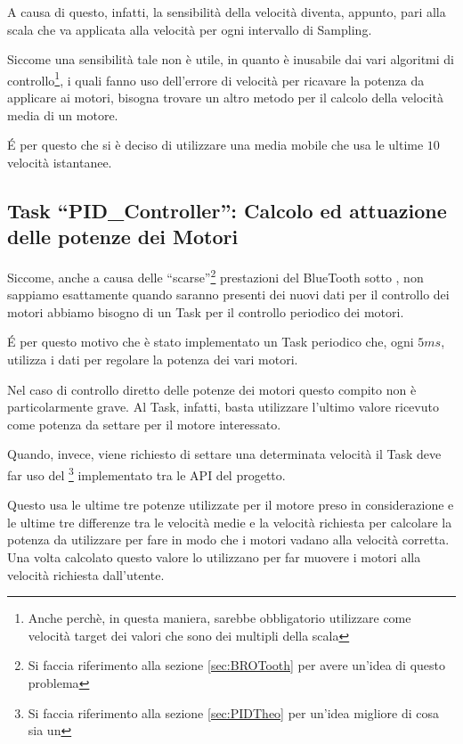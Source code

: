 A causa di questo, infatti, la sensibilità della velocità diventa, appunto,
pari alla scala che va applicata alla velocità per ogni intervallo di
Sampling.

Siccome una sensibilità tale non è utile, in quanto è inusabile dai vari
algoritmi di controllo\footnote{Anche perchè, in questa maniera, sarebbe
obbligatorio utilizzare come velocità target dei valori che sono dei
multipli della scala}, i quali fanno uso dell'errore di velocità per
ricavare la potenza da applicare ai motori, bisogna trovare un altro metodo
per il calcolo della velocità media di un motore.

\'E per questo che si è deciso di utilizzare una media mobile che usa le
ultime $10$ velocità istantanee.

\subsection[Task ``PID\_Controller'']{Task ``PID\_Controller'': Calcolo ed
attuazione delle potenze dei Motori}\label{sec:BROPIDS}
Siccome, anche a causa delle ``scarse''\footnote{Si faccia riferimento alla
sezione \ref{sec:BROTooth} per avere un'idea di questo problema}
prestazioni del BlueTooth sotto \nxtOSEK{}, non sappiamo esattamente quando 
saranno presenti dei nuovi dati per il controllo dei motori abbiamo bisogno
di un Task per il controllo periodico dei motori.

\'E per questo motivo che è stato implementato un Task periodico che, ogni
$5ms$, utilizza i dati per regolare la potenza dei vari motori.

Nel caso di controllo diretto delle potenze dei motori questo compito non è
particolarmente grave. Al Task, infatti, basta utilizzare l'ultimo valore
ricevuto come potenza da settare per il motore interessato.

Quando, invece, viene richiesto di settare una determinata velocità il Task
deve far uso del \PID{}\footnote{Si faccia riferimento alla sezione
\ref{sec:PIDTheo} per un'idea migliore di cosa sia un \PID{}} implementato
tra le API del progetto.

Questo usa le ultime tre potenze utilizzate per il motore preso in
considerazione e le ultime tre differenze tra le velocità medie e la
velocità richiesta per calcolare la potenza da utilizzare per fare in modo
che i motori vadano alla velocità corretta. Una volta calcolato questo
valore lo utilizzano per far muovere i motori alla velocità richiesta
dall'utente.

